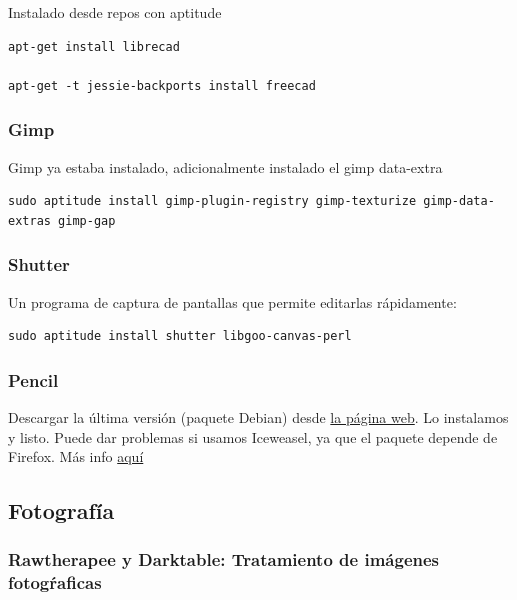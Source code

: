 \documentclass[12pt,spanish,]{scrartcl}
\begin{document}
Instalado desde repos con aptitude

\begin{verbatim}
apt-get install librecad

apt-get -t jessie-backports install freecad
\end{verbatim}

\subsubsection{Gimp}\label{gimp}

Gimp ya estaba instalado, adicionalmente instalado el gimp data-extra

\begin{verbatim}
sudo aptitude install gimp-plugin-registry gimp-texturize gimp-data-extras gimp-gap
\end{verbatim}

\subsubsection{Shutter}\label{shutter}

Un programa de captura de pantallas que permite editarlas rápidamente:

\begin{verbatim}
sudo aptitude install shutter libgoo-canvas-perl
\end{verbatim}

\subsubsection{Pencil}\label{pencil}

Descargar la última versión (paquete Debian) desde
\href{http://pencil.evolus.vn/}{la página web}. Lo instalamos y listo.
Puede dar problemas si usamos Iceweasel, ya que el paquete depende de
Firefox. Más info
\href{https://www.linuxwebzone.com/install-pencil-on-debian/}{aquí}

\subsection{Fotografía}\label{fotografuxeda}

\subsubsection{Rawtherapee y Darktable: Tratamiento de imágenes
fotogŕaficas}\label{rawtherapee-y-darktable-tratamiento-de-imuxe1genes-fotogux155aficas}
\end{document}
